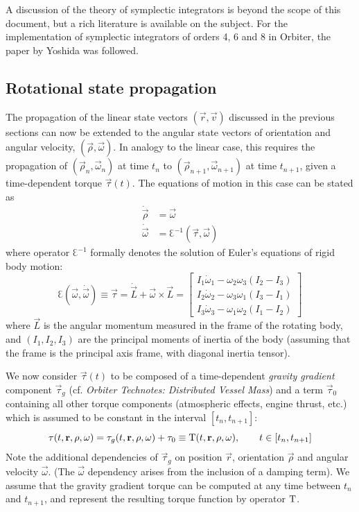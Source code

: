 \documentclass[Orbiter Technical Reference.tex]{subfiles}
\begin{document}
A discussion of the theory of symplectic integrators is beyond the scope of this document, but a rich literature is available on the subject. For the implementation of symplectic integrators of orders 4, 6 and 8 in Orbiter, the paper by Yoshida \cite{yoshida1990} was followed.

\subsection{Rotational state propagation}
The propagation of the linear state vectors $(\vec{r},\vec{v})$ discussed in the previous sections can now be extended to the angular state vectors of orientation and angular velocity, $(\vec{\rho},\vec{\omega})$. In analogy to the linear case, this requires the propagation of $(\vec{\rho}_n,\vec{\omega}_n)$ at time $t_n$ to $(\vec{\rho}_{n+1},\vec{\omega}_{n+1})$ at time $t_{n+1}$, given a time-dependent torque $\vec{\tau}(t)$.
The equations of motion in this case can be stated as
\begin{equation}
\begin{split}
\dot{\vec{\rho}} &= \vec\omega \\
\dot{\vec{\omega}} &= \Euler^{-1}(\vec\tau,\vec\omega)
\end{split}
\end{equation}
where operator $\Euler^{-1}$ formally denotes the solution of Euler's equations of rigid body motion:
\begin{equation}
\Euler(\vec\omega,\dot{\vec\omega}) \equiv \vec\tau = 
\dot{\vec{L}}+\vec\omega \times \vec{L} =
\left[
\begin{array}{ccc}
I_1\dot\omega_1 - \omega_2\omega_3(I_2-I_3) \\
I_2\dot\omega_2 - \omega_3\omega_1(I_3-I_1) \\
I_3\dot\omega_3 - \omega_1\omega_2(I_1-I_2)
\end{array}
\right]
\end{equation}
where $\vec{L}$ is the angular momentum measured in the frame of the rotating body, and $(I_1,I_2,I_3)$ are the principal moments of inertia of the body (assuming that the frame is the principal axis frame, with diagonal inertia tensor).

We now consider $\vec\tau(t)$ to be composed of a time-dependent \emph{gravity gradient} component $\vec\tau_g$ (cf. \emph{Orbiter Technotes: Distributed Vessel Mass}) and a term $\vec\tau_0$ containing all other torque components (atmospheric effects, engine thrust, etc.) which is assumed to be constant in the interval $[t_n, t_{n+1}]$:
\begin{equation}
\mathbf{\tau}(t,\mathbf{r},\mathbf{\rho},\mathbf{\omega}) = \mathbf{\tau}_g(t,\mathbf{r},\mathbf{\rho},\mathbf{\omega}) + \mathbf{\tau}_0 \equiv \mathrm{T}(t,\mathbf{r},\mathbf{\rho},\mathbf{\omega}), \qquad t \in [t_n, t_{n+1}]
\end{equation}
Note the additional dependencies of $\vec\tau_g$ on position $\vec{r}$, orientation $\vec\rho$ and angular velocity $\vec\omega$. (The $\vec\omega$ dependency arises from the inclusion of a damping term).
We assume that the gravity gradient torque can be computed at any time between $t_n$ and $t_{n+1}$, and represent the resulting torque function by operator $\mathrm{T}$.
\end{document}
